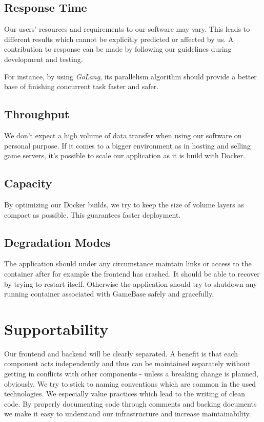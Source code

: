 \documentclass[a4paper,12pt,chapterprefix=false,bibliography=totoc,listof=totoc,]{scrreprt}
\begin{document}
\subsection{Response Time}
Our users' resources and requirements to our software may vary. This leads to different results which cannot be explicitly predicted or affected by us. A contribution to response can be made by following our guidelines during development and testing.

For instance, by using \emph{GoLang}, its parallelism algorithm should provide a better base of finishing concurrent task faster and safer.

\subsection{Throughput}
We don't expect a high volume of data transfer when using our software on personal purpose. If it comes to a bigger environment as in hosting and selling game servers, it's possible to scale our application as it is build with Docker. 


\subsection{Capacity}
By optimizing our Docker builds, we try to keep the size of volume layers as compact as possible. This guarantees faster deployment.


\subsection{Degradation Modes}
The application should under any circumstance maintain links or access to the container after for example the frontend has crashed. It should be able to recover by trying to restart itself. Otherwise the application should try to shutdown any running container associated with GameBase safely and gracefully. 


\section{Supportability}
Our frontend and backend will be clearly separated. A benefit is that each component acts independently and thus can be maintained separately without getting in conflicts with other components - unless a breaking change is planned, obviously. We try to stick to naming conventions which are common in the used technologies. We especially value practices which lead to the writing of clean code. By properly documenting code through comments and backing documents we make it easy to understand our infrastructure and increase maintainability.
\end{document}

